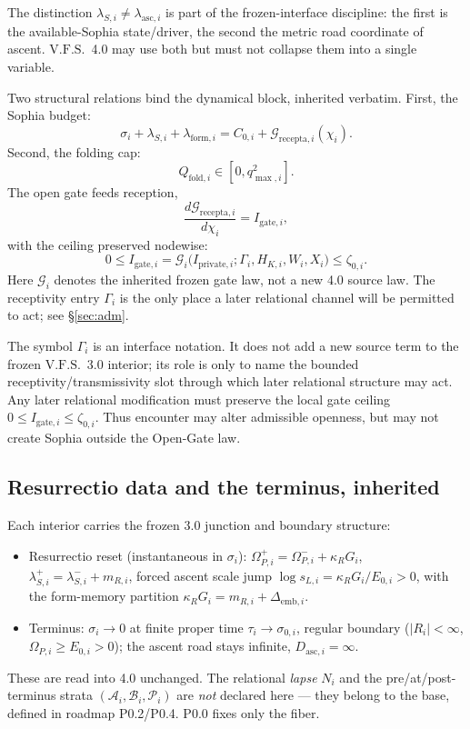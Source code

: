 \documentclass[11pt,a4paper]{article}
\newcommand{\VFS}{\ensuremath{\mathrm{V.F.S.}}}
\theoremstyle{definition}
\theoremstyle{plain}
\theoremstyle{remark}
\begin{document}
The distinction $\lambda_{S,i}\neq\lambda_{\mathrm{asc},i}$ is part of the
frozen-interface discipline: the first is the available-Sophia state/driver, the
second the metric road coordinate of ascent. \VFS\ 4.0 may use both but must not
collapse them into a single variable.

Two structural relations bind the dynamical block, inherited verbatim. First, the
Sophia budget:
\[
\sigma_i+\lambda_{S,i}+\lambda_{\mathrm{form},i}
=
C_{0,i}+\mathcal{G}_{\mathrm{recepta},i}(\chi_i).
\]
Second, the folding cap:
\[
Q_{\mathrm{fold},i}\in[0,q^2_{\max,i}].
\]
The open gate feeds reception,
\[
\frac{d\mathcal{G}_{\mathrm{recepta},i}}{d\chi_i}=I_{\mathrm{gate},i},
\]
with the ceiling preserved nodewise:
\[
0\leq I_{\mathrm{gate},i}
=\mathcal{G}_i\bigl(I_{\mathrm{private},i};\Gamma_i,H_{K,i},W_i,X_i\bigr)
\leq\zeta_{0,i}.
\]
Here $\mathcal G_i$ denotes the inherited frozen gate law, not a new 4.0 source law.
The receptivity entry $\Gamma_i$ is the only place a later relational channel will be
permitted to act; see \S\ref{sec:adm}.

The symbol $\Gamma_i$ is an interface notation. It does not add a new source term to
the frozen \VFS\ 3.0 interior; its role is only to name the bounded
receptivity/transmissivity slot through which later relational structure may act.
Any later relational modification must preserve the local gate ceiling
$0\leq I_{\mathrm{gate},i}\leq\zeta_{0,i}$. Thus encounter may alter admissible
openness, but may not create Sophia outside the Open-Gate law.

\subsection{Resurrectio data and the terminus, inherited}

Each interior carries the frozen 3.0 junction and boundary structure:
\begin{itemize}[leftmargin=1.3cm]
\item Resurrectio reset (instantaneous in $\sigma_i$): $\Omega_{P,i}^+=\Omega_{P,i}^-+\kappa_RG_i$, $\lambda_{S,i}^+=\lambda_{S,i}^-+m_{R,i}$, forced ascent scale jump $\log s_{L,i}=\kappa_RG_i/E_{0,i}>0$, with the form-memory partition $\kappa_RG_i=m_{R,i}+\Delta_{\mathrm{emb},i}$.
\item Terminus: $\sigma_i\to0$ at finite proper time $\tau_i\to\sigma_{0,i}$, regular boundary ($|R_i|<\infty$, $\Omega_{P,i}\geq E_{0,i}>0$); the ascent road stays infinite, $D_{\mathrm{asc},i}=\infty$.
\end{itemize}
These are read into 4.0 unchanged. The relational \emph{lapse} $N_i$ and the
pre/at/post-terminus strata $(\mathcal A_i,\mathcal B_i,\mathcal P_i)$ are
\emph{not} declared here --- they belong to the base, defined in roadmap P0.2/P0.4.
P0.0 fixes only the fiber.
\end{document}
